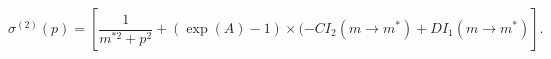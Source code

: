 \begin{equation}
\sigma^{(2)}(p)=[\frac{1}{m^{\ast2}+p^{2}}+(\exp(A)-1)\times(-CI_{2}%
(m\rightarrow m^{\ast})+DI_{1}(m\rightarrow m^{\ast})].
\end{equation}

